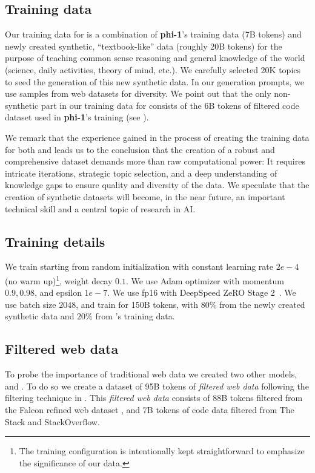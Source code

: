 \subsection{Training data}
Our training data for \phionenlnointer is a combination of \textbf{phi-1}'s training data (7B tokens) and newly created synthetic, ``textbook-like'' data (roughly 20B tokens) for the purpose of teaching common sense reasoning and general knowledge of the world (science, daily activities, theory of mind, etc.). We carefully selected 20K topics to seed the generation of this new synthetic data. In our generation prompts, we use samples from web datasets for diversity. %
We point out that the only non-synthetic part in our training data for \phionenlnointer consists of the 6B tokens of filtered code dataset 
used in \textbf{phi-1}'s training 
(see \cite{gunasekar2023textbooks}). %

We remark that the experience gained in the process of creating the training data for both \phione and \phionenlnointer leads us to the conclusion that the creation of a robust and comprehensive dataset demands more than raw computational power: {It requires intricate iterations, strategic topic selection, and a deep understanding of knowledge gaps to ensure quality and diversity of the data. We speculate that the creation of synthetic datasets will become, in the near future, an important technical skill and a central topic of research in AI.}

\subsection{Training details}
We train {\phionepointfive } starting from random initialization with constant learning rate $2e-4$ (no warm up)\footnote{The training configuration is intentionally kept straightforward to emphasize the significance of our data.}, weight decay $0.1$. We use Adam optimizer with momentum $0.9, 0.98$, and epsilon $1e-7$. We use fp16 with DeepSpeed ZeRO Stage 2~\cite{rajbhandari2020zero}. We use batch size $2048$, and train for 150B tokens, with $80\%$ from the newly created synthetic data and $20\%$ from \phione\!'s training data. 

\subsection{Filtered web data}
To probe the importance of traditional web data we created two other models, \phionenlbase and \phionenl\!. To do so we create a dataset of 95B tokens of \textit{filtered web data} following the filtering technique in \cite{gunasekar2023textbooks}. This \textit{filtered web data} consists of 88B tokens filtered from the Falcon refined web dataset \cite{penedo2023refinedweb}, and  7B tokens of code data filtered from The Stack \cite{kocetkov2022stack} and StackOverflow.   

